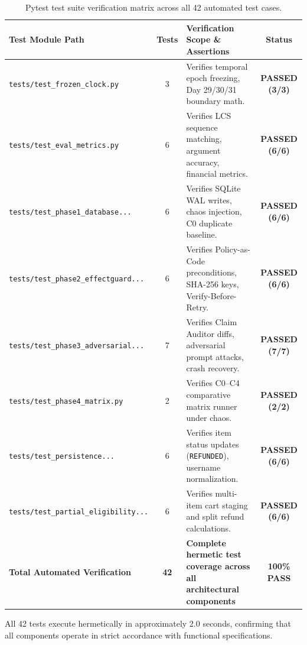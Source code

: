 \begin{table}[H]
\centering
\small
\renewcommand{\arraystretch}{1.2}
\begin{tabularx}{\textwidth}{p{4.5cm}cp{5.5cm}c}
\toprule
\textbf{Test Module Path} & \textbf{Tests} & \textbf{Verification Scope \& Assertions} & \textbf{Status} \\
\midrule
\texttt{tests/test\_frozen\_clock.py} & 3 & Verifies temporal epoch freezing, Day 29/30/31 boundary math. & \textbf{PASSED (3/3)} \\
\texttt{tests/test\_eval\_metrics.py} & 6 & Verifies LCS sequence matching, argument accuracy, financial metrics. & \textbf{PASSED (6/6)} \\
\texttt{tests/test\_phase1\_database...} & 6 & Verifies SQLite WAL writes, chaos injection, C0 duplicate baseline. & \textbf{PASSED (6/6)} \\
\texttt{tests/test\_phase2\_effectguard...} & 6 & Verifies Policy-as-Code preconditions, SHA-256 keys, Verify-Before-Retry. & \textbf{PASSED (6/6)} \\
\texttt{tests/test\_phase3\_adversarial...} & 7 & Verifies Claim Auditor diffs, adversarial prompt attacks, crash recovery. & \textbf{PASSED (7/7)} \\
\texttt{tests/test\_phase4\_matrix.py} & 2 & Verifies C0–C4 comparative matrix runner under chaos. & \textbf{PASSED (2/2)} \\
\texttt{tests/test\_persistence...} & 6 & Verifies item status updates (\texttt{REFUNDED}), username normalization. & \textbf{PASSED (6/6)} \\
\texttt{tests/test\_partial\_eligibility...}& 6 & Verifies multi-item cart staging and split refund calculations. & \textbf{PASSED (6/6)} \\
\midrule
\textbf{Total Automated Verification} & \textbf{42} & \textbf{Complete hermetic test coverage across all architectural components} & \textbf{100\% PASS} \\
\bottomrule
\end{tabularx}
\caption{Pytest test suite verification matrix across all 42 automated test cases.}
\label{tab:test_suite_matrix}
\end{table}
All 42 tests execute hermetically in approximately 2.0 seconds, confirming that all components operate in strict accordance with functional specifications.
